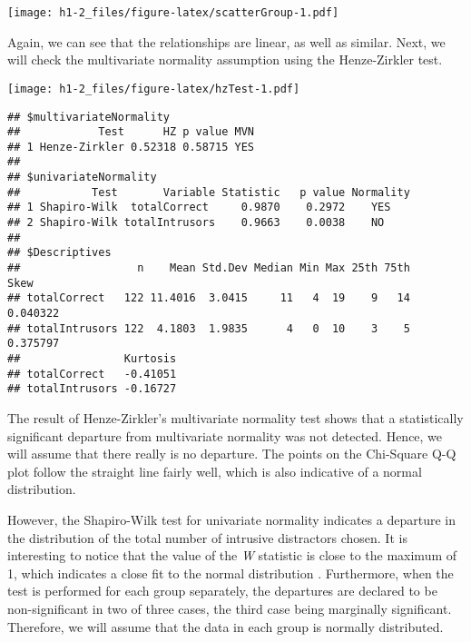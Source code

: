 \documentclass[12pt,]{article}
\newenvironment{Shaded}{\begin{snugshade}}{\end{snugshade}}
\newcommand{\DataTypeTok}[1]{\textcolor[rgb]{0.13,0.29,0.53}{#1}}
\newcommand{\KeywordTok}[1]{\textcolor[rgb]{0.13,0.29,0.53}{\textbf{#1}}}
\newcommand{\NormalTok}[1]{#1}
\newcommand{\OperatorTok}[1]{\textcolor[rgb]{0.81,0.36,0.00}{\textbf{#1}}}
\newcommand{\StringTok}[1]{\textcolor[rgb]{0.31,0.60,0.02}{#1}}
\begin{document}
\texttt{[image: h1-2\_files/figure-latex/scatterGroup-1.pdf]}

Again, we can see that the relationships are linear, as well as similar.
Next, we will check the multivariate normality assumption using the
Henze-Zirkler test.

\begin{Shaded}
\end{Shaded}

\texttt{[image: h1-2\_files/figure-latex/hzTest-1.pdf]}

\begin{verbatim}
## $multivariateNormality
##            Test      HZ p value MVN
## 1 Henze-Zirkler 0.52318 0.58715 YES
## 
## $univariateNormality
##           Test       Variable Statistic   p value Normality
## 1 Shapiro-Wilk  totalCorrect     0.9870    0.2972    YES   
## 2 Shapiro-Wilk totalIntrusors    0.9663    0.0038    NO    
## 
## $Descriptives
##                  n    Mean Std.Dev Median Min Max 25th 75th     Skew
## totalCorrect   122 11.4016  3.0415     11   4  19    9   14 0.040322
## totalIntrusors 122  4.1803  1.9835      4   0  10    3    5 0.375797
##                Kurtosis
## totalCorrect   -0.41051
## totalIntrusors -0.16727
\end{verbatim}

The result of Henze-Zirkler's multivariate normality test shows that a
statistically significant departure from multivariate normality was not
detected. Hence, we will assume that there really is no departure. The
points on the Chi-Square Q-Q plot follow the straight line fairly well,
which is also indicative of a normal distribution.

However, the Shapiro-Wilk test for univariate normality indicates a
departure in the distribution of the total number of intrusive
distractors chosen. It is interesting to notice that the value of the
\emph{W} statistic is close to the maximum of 1, which indicates a close
fit to the normal distribution \citep{salkind_encyclopedia_2007}.
Furthermore, when the test is performed for each group separately, the
departures are declared to be non-significant in two of three cases, the
third case being marginally significant. Therefore, we will assume that
the data in each group is normally distributed.
\end{document}
